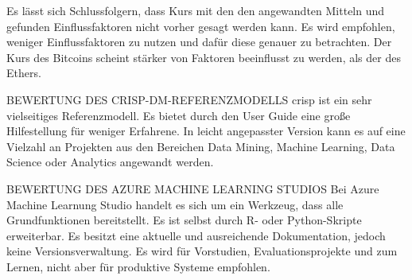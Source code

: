 Es lässt sich Schlussfolgern, dass Kurs mit den den angewandten Mitteln und gefunden Einflussfaktoren nicht vorher gesagt werden kann. Es wird empfohlen, weniger Einflussfaktoren zu nutzen und dafür diese genauer zu betrachten. Der Kurs des Bitcoins scheint stärker von Faktoren beeinflusst zu werden, als der des Ethers.

{\normalsize BEWERTUNG DES CRISP-DM-REFERENZMODELLS} \newline
\gls{crisp} ist ein sehr vielseitiges Referenzmodell. Es bietet durch den User Guide eine große Hilfestellung für weniger Erfahrene. In leicht angepasster Version kann es auf eine Vielzahl an Projekten aus den Bereichen Data Mining, Machine Learning, Data Science oder Analytics angewandt werden.

{\normalsize BEWERTUNG DES AZURE MACHINE LEARNING STUDIOS} \newline
Bei Azure Machine Learnung Studio handelt es sich um ein Werkzeug, dass alle Grundfunktionen bereitstellt. Es ist selbst durch R- oder Python-Skripte erweiterbar. Es besitzt eine aktuelle und ausreichende Dokumentation, jedoch keine Versionsverwaltung. Es wird für Vorstudien, Evaluationsprojekte und zum Lernen, nicht aber für produktive Systeme empfohlen.
